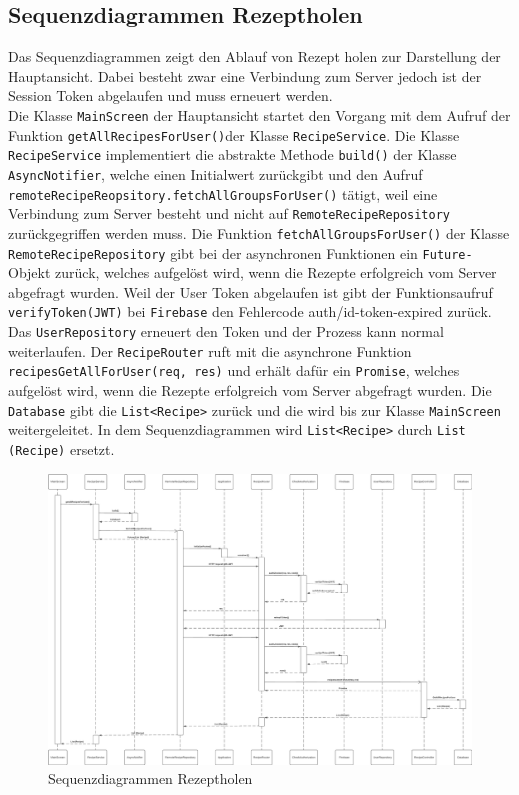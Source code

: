 \documentclass{entwurfsheft}
\begin{document}
    \subsection{Sequenzdiagrammen Rezeptholen}
            Das Sequenzdiagrammen zeigt den Ablauf von Rezept holen zur Darstellung der Hauptansicht. Dabei besteht zwar eine Verbindung zum Server jedoch ist der Session Token abgelaufen und muss erneuert werden.\\
            Die Klasse \texttt{MainScreen} der Hauptansicht startet den Vorgang mit dem Aufruf der Funktion \texttt{getAllRecipesForUser()}der Klasse \texttt{RecipeService}. Die Klasse \texttt{RecipeService} implementiert die abstrakte Methode \texttt{build()} der Klasse \texttt{AsyncNotifier}, welche einen Initialwert zurückgibt und den Aufruf \texttt{remoteRecipeReopsitory.fetchAllGroupsForUser()} tätigt, weil eine Verbindung zum Server besteht und nicht auf \texttt{RemoteRecipeRepository} zurückgegriffen werden muss. Die Funktion \texttt{fetchAllGroupsForUser()} der Klasse \texttt{RemoteRecipeRepository} gibt bei der asynchronen Funktionen ein \texttt{Future-}Objekt zurück, welches aufgelöst wird, wenn die Rezepte erfolgreich vom Server abgefragt wurden. Weil der User Token abgelaufen ist gibt der Funktionsaufruf \texttt{verifyToken(JWT)} bei \texttt{Firebase} den Fehlercode auth\slash id-token-expired zurück. Das \texttt{UserRepository} erneuert den Token und der Prozess kann normal weiterlaufen. Der \texttt{RecipeRouter} ruft mit die asynchrone Funktion \texttt{recipesGetAllForUser(req, res)} und erhält dafür ein \texttt{Promise}, welches aufgelöst wird, wenn die Rezepte erfolgreich vom Server abgefragt wurden. Die \texttt{Database} gibt die \texttt{List<Recipe>} zurück und die wird bis zur Klasse \texttt{MainScreen} weitergeleitet. In dem Sequenzdiagrammen wird \texttt{List<Recipe>} durch \texttt{List (Recipe)} ersetzt.
        
        \begin{figure}[htp]
            \centering
            \includegraphics[width = \linewidth]{images/processDescription/SequenzdiagrammRecipeFetching.pdf}
            \caption{Sequenzdiagrammen Rezeptholen}
        \end{figure}
\end{document}
